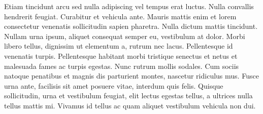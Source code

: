 Etiam tincidunt arcu sed nulla adipiscing vel tempus erat luctus. Nulla
convallis hendrerit feugiat. Curabitur et vehicula ante. Mauris mattis enim
et lorem consectetur venenatis sollicitudin sapien pharetra. Nulla dictum
mattis tincidunt. Nullam urna ipsum, aliquet consequat semper eu, vestibulum
at dolor. Morbi libero tellus, dignissim ut elementum a, rutrum nec lacus.
Pellentesque id venenatis turpis. Pellentesque habitant morbi tristique
senectus et netus et malesuada fames ac turpis egestas. Nunc rutrum mollis
sodales. Cum sociis natoque penatibus et magnis dis parturient montes,
nascetur ridiculus mus. Fusce urna ante, facilisis sit amet posuere vitae,
interdum quis felis. Quisque sollicitudin, urna et vestibulum feugiat, elit
lectus egestas tellus, a ultrices nulla tellus mattis mi. Vivamus id tellus
ac quam aliquet vestibulum vehicula non dui.
